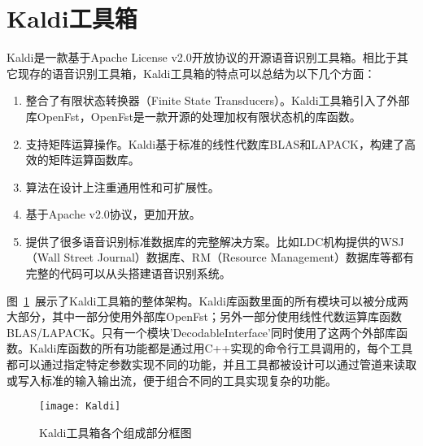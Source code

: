 \section{Kaldi工具箱}
Kaldi是一款基于Apache License v2.0开放协议的开源语音识别工具箱。相比于其它现存的语音识别工具箱，Kaldi工具箱的特点可以总结为以下几个方面：
\begin{enumerate}
  \item 整合了有限状态转换器（Finite State Transducers）。Kaldi工具箱引入了外部库OpenFst\cite{allauzen2007openfst}，OpenFst是一款开源的处理加权有限状态机的库函数。
  \item 支持矩阵运算操作。Kaldi基于标准的线性代数库BLAS和LAPACK，构建了高效的矩阵运算函数库。
  \item 算法在设计上注重通用性和可扩展性。
  \item 基于Apache v2.0协议，更加开放。
  \item 提供了很多语音识别标准数据库的完整解决方案。比如LDC机构提供的WSJ（Wall Street Journal）数据库、RM（Resource Management）数据库等都有完整的代码可以从头搭建语音识别系统。
\end{enumerate}

图~\ref{fig:Kaldi}~展示了Kaldi工具箱的整体架构。Kaldi库函数里面的所有模块可以被分成两大部分，其中一部分使用外部库OpenFst；另外一部分使用线性代数运算库函数BLAS/LAPACK。只有一个模块'DecodableInterface'同时使用了这两个外部库函数。Kaldi库函数的所有功能都是通过用C++实现的命令行工具调用的，每个工具都可以通过指定特定参数实现不同的功能，并且工具都被设计可以通过管道来读取或写入标准的输入输出流，便于组合不同的工具实现复杂的功能。
\begin{figure}[htbp]
\centering
\texttt{[image: Kaldi]}
\caption{Kaldi工具箱各个组成部分框图}\label{fig:Kaldi}
\vspace{\baselineskip}
\end{figure}

